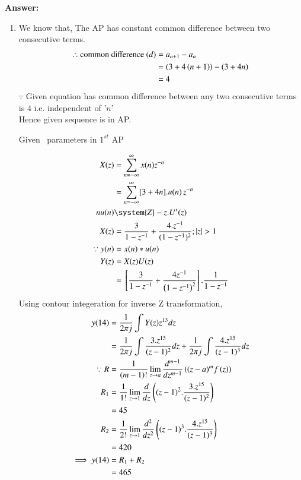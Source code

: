 \documentclass[journal,12pt,twocolumn]{IEEEtran}
\theoremstyle{remark}
\begin{document}
\textbf{Answer:} 
\begin{enumerate} [label=(\roman*)]
    \item We know that, The AP has constant common difference between two consecutive terms.
    \begin{align}
        \therefore \text{common difference } (d) &= a_{n+1} - a_n \\
        &= \left(3+4\left(n+1\right)\right) -\left(3+4n\right)\\
        &= 4
    \end{align}
   $\because$ Given equation has common difference between any two consecutive terms is $4$ i.e. independent of '$n$'\\
    Hence given sequence is in AP.
    \begin{table}[htbp] 
    \centering
    
    \caption{Given \, parameters in $1^{st}$ AP}
    \label{given parameters list}
    \end{table}

    \begin{align}
         X(z) &= \sum_{n = -\infty}^{\infty} x(n) z^{-n} \label{eq:z-transform}\\
         &= \sum_{n = -\infty}^{\infty}[3 + 4n].u(n) \, z^{-n} \\
        nu(n) &\system{Z} -z.U'(z)\\
        X(z) &= \frac{3}{1-z^{-1}} + \frac{4.z^{-1}}{(1-z^{-1})^2} ; |z|>1\\
        \because y(n) &= x(n) * u(n)\\
        Y(z) &= X(z)U(z)\\
        &= \sbrak{\frac{3}{1-z^{-1}} + \frac{4 z^{-1}}{\left(1-z^{-1}\right)^2} }.\frac{1}{1-z^{-1}}
    \end{align}
    Using contour integeration for inverse Z transformation,\\
    \begin{align}
        y(14) &= \frac{1}{2\pi j}\int Y(z) z^{13} dz \\
         &= \frac{1}{2\pi j}\int \frac{3.z^{15}}{(z-1)^{2}} dz + \frac{1}{2\pi j}\int \frac{4.z^{15}}{(z-1)^{3}} dz\\
        \because R&=\frac{1}{\left(m-1\right)!}\lim\limits_{z\to a}\frac{d^{m-1}}{dz^{m-1}}\left({(z-a)}^{m}f\left(z\right)\right)\\
        R_1 &=\frac{1}{1!}\lim\limits_{z\to 1}\frac{d}{dz}\left((z-1)^2.\frac{3.z^{15}}{(z-1)^{2}}\right)\\
        &= 45\\
        R_2 &=\frac{1}{2!}\lim\limits_{z\to 1}\frac{d^2}{dz^2}\left((z-1)^3.\frac{4.z^{15}}{(z-1)^{3}}\right)\\
        &= 420\\
        \implies y(14) &= R_1 + R_2 \\
        &= 465
    \end{align}
    

\end{enumerate}
\end{document}
